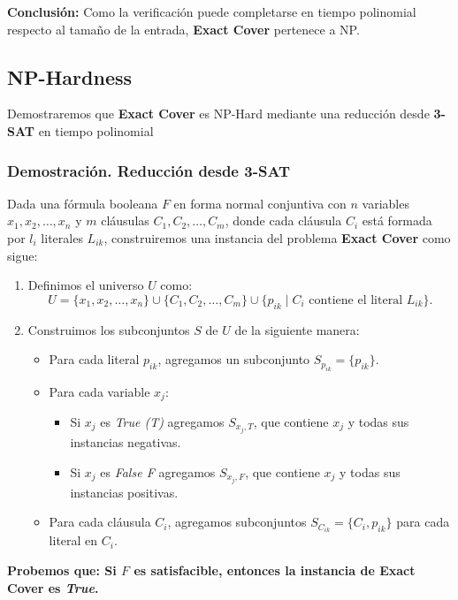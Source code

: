 \documentclass[a4paper,12pt]{article}
\begin{document}
\textbf{Conclusión:} Como la verificación puede completarse en tiempo polinomial respecto al tamaño de la entrada, \textbf{Exact Cover} pertenece a NP.

\subsection{NP-Hardness}
Demostraremos que \textbf{Exact Cover} es NP-Hard mediante una reducción desde \textbf{3-SAT} en tiempo polinomial 

\subsubsection{Demostración. Reducción desde \textbf{3-SAT}}
Dada una fórmula booleana $F$ en forma normal conjuntiva con $n$ variables $x_1, x_2, \dots, x_n$ y $m$ cláusulas $C_1, C_2, \dots, C_m$, donde cada cláusula $C_i$ está formada por $l_i$ literales $L_{ik}$, construiremos una instancia del problema \textbf{Exact Cover} como sigue:
\begin{enumerate}
    \item Definimos el universo $U$ como:
    \[
    U = \{x_1, x_2, \dots, x_n\} \cup \{C_1, C_2, \dots, C_m\} \cup \{p_{ik} \mid C_i \text{ contiene el literal } L_{ik}\}.
    \]
    \item Construimos los subconjuntos $S$ de $U$ de la siguiente manera:
    \begin{itemize}
        \item Para cada literal $p_{ik}$, agregamos un subconjunto $S_{p_{ik}} = \{p_{ik}\}$.
        \item Para cada variable $x_j$:
        \begin{itemize}
            \item Si $x_j$ es \textit{True (T)} agregamos $S_{x_j,T}$, que contiene $x_j$ y todas sus instancias negativas.
            \item Si $x_j$ es \textit{False {F}} agregamos $S_{x_j,F}$, que contiene $x_j$ y todas sus instancias positivas.
        \end{itemize}
        \item Para cada cláusula $C_i$, agregamos subconjuntos $S_{C_{ik}} = \{C_i, p_{ik}\}$ para cada literal en $C_i$.
    \end{itemize}
\end{enumerate}

\textbf{Probemos que: Si $F$ es satisfacible, entonces la instancia de \textbf{Exact Cover} es \textit{True}.}
\end{document}
